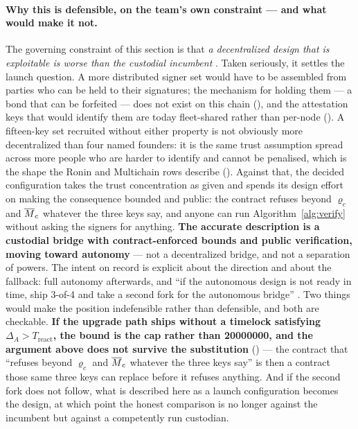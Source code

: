 \paragraph{Why this is defensible, on the team's own constraint --- and what would make it not.} The
governing constraint of this section is that \emph{a decentralized design that is exploitable is
worse than the custodial incumbent} . Taken seriously, it settles
the launch question. A more distributed signer set would have to be assembled from parties who can be
held to their signatures; the mechanism for holding them --- a bond that can be forfeited --- does
not exist on this chain (), and the attestation keys that would identify them are
today fleet-shared rather than per-node (). A fifteen-key set
recruited without either property is not obviously more decentralized than four named founders: it is
the same trust assumption spread across more people who are harder to identify and cannot be
penalised, which is the shape the Ronin and Multichain rows describe
(). Against that, the decided
configuration takes the trust concentration as given and spends its design effort on making the
consequence bounded and public: the contract refuses beyond $\varrho_c$ and $\overline{M}_{c}$ whatever the
three keys say, and anyone can run Algorithm~\ref{alg:verify} without asking the signers for
anything. \textbf{The accurate description is a custodial bridge with contract-enforced bounds and
public verification, moving toward autonomy} --- not a decentralized bridge, and not a separation of
powers. The intent on record is explicit about the direction and about the fallback: full autonomy
afterwards, and ``if the autonomous design is not ready in time, ship 3-of-4 and take a second fork
for the autonomous bridge'' . Two things would make the position
indefensible rather than defensible, and both are checkable. \textbf{If the upgrade path ships
without a timelock satisfying $\Delta_A > T_{\mathrm{react}}$, the bound is the cap rather than
\num{20000000}\flux, and the argument above does not survive the substitution}
() --- the contract that ``refuses beyond $\varrho_c$ and $\overline{M}_{c}$
whatever the three keys say'' is then a contract those same three keys can replace before it
refuses anything. And if the second fork does not follow, what is described here as a launch
configuration becomes the design, at which point the honest comparison is no longer against the
incumbent but against a competently run custodian. \planned

